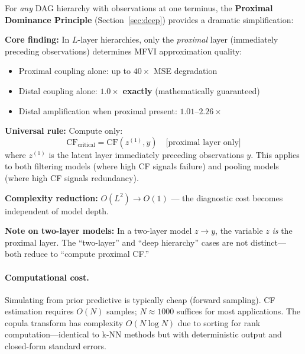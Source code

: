 \documentclass[10pt]{article} %
\theoremstyle{plain}
\theoremstyle{definition}
\begin{document}
\begin{tcolorbox}[breakable, colback=blue!5, colframe=blue!50!black, title=\textbf{Key Simplification: Proximal Dominance}, fonttitle=\bfseries]
For \emph{any} DAG hierarchy with observations at one terminus, the \textbf{Proximal Dominance Principle} (Section~\ref{sec:deep}) provides a dramatic simplification:

\textbf{Core finding:} In $L$-layer hierarchies, only the \emph{proximal} layer (immediately preceding observations) determines MFVI approximation quality:
\begin{itemize}
    \item Proximal coupling alone: up to $40\times$ MSE degradation
    \item Distal coupling alone: $1.0\times$ \textbf{exactly} (mathematically guaranteed)
    \item Distal amplification when proximal present: $1.01$--$2.26\times$
\end{itemize}

\textbf{Universal rule:} Compute only:
\begin{equation*}
\text{CF}_{\text{critical}} = \text{CF}(z^{(1)}, y) \quad \text{[proximal layer only]}
\end{equation*}
where $z^{(1)}$ is the latent layer immediately preceding observations $y$. This applies to both filtering models (where high CF signals failure) and pooling models (where high CF signals redundancy).

\textbf{Complexity reduction:} $O(L^2) \to O(1)$ --- the diagnostic cost becomes independent of model depth.

\textbf{Note on two-layer models:} In a two-layer model $z \to y$, the variable $z$ \emph{is} the proximal layer. The ``two-layer'' and ``deep hierarchy'' cases are not distinct---both reduce to ``compute proximal CF.''
\end{tcolorbox}

\paragraph{Computational cost.} Simulating from prior predictive is typically cheap (forward sampling). CF estimation requires $O(N)$ samples; $N \approx 1000$ suffices for most applications. The copula transform has complexity $O(N \log N)$ due to sorting for rank computation---identical to k-NN methods but with deterministic output and closed-form standard errors.
\end{document}
